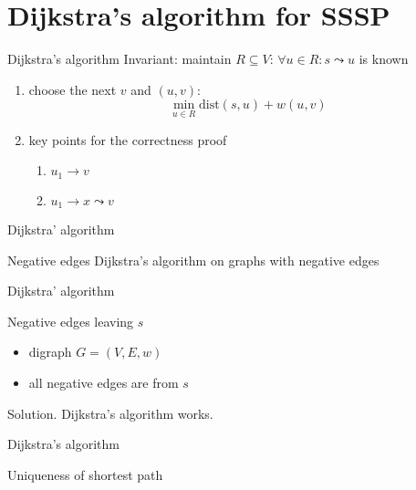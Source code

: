 \section{Dijkstra's algorithm for SSSP}

\begin{frame}{Dijkstra's algorithm}
  Invariant: maintain $R \subseteq V$: $\forall u \in R: s \leadsto u$ is known
  \begin{enumerate}
    \item choose the next $v$ and $(u,v)$:
      \[ \min_{u \in R} \text{dist}(s,u) + w(u,v) \]
    \item key points for the correctness proof
      \begin{enumerate}
	\item $u_{1} \to v$
	\item $u_{1} \to x \leadsto v$
      \end{enumerate}
  \end{enumerate}
\end{frame}
\begin{frame}{Dijkstra' algorithm}
  \begin{exampleblock}{Negative edges }
    Dijkstra's algorithm on graphs with negative edges
  \end{exampleblock}
\end{frame}
\begin{frame}{Dijkstra' algorithm}
  \begin{exampleblock}{Negative edges leaving $s$ }
    \begin{itemize}
      \item digraph $G = (V, E, w)$
      \item all negative edges are from $s$
    \end{itemize}
  \end{exampleblock}

  \begin{block}{Solution.}
    Dijkstra's algorithm works.
  \end{block}
\end{frame}
\begin{frame}{Dijkstra's algorithm}
  \begin{exampleblock}{Uniqueness of shortest path }
    
  \end{exampleblock}
\end{frame}
